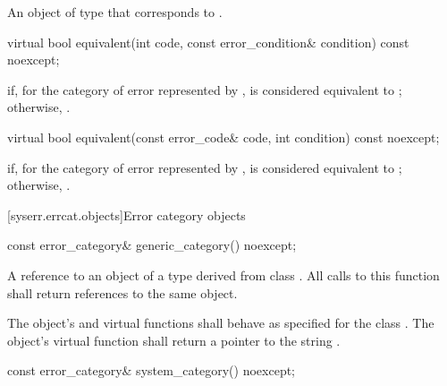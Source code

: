 \begin{itemdescr}
\pnum
\returns An object of type  that corresponds to .
\end{itemdescr}

%
\begin{itemdecl}
virtual bool equivalent(int code, const error_condition& condition) const noexcept;
\end{itemdecl}

\begin{itemdescr}
\pnum
\returns {} if, for the category of error represented by ,  is considered equivalent to ; otherwise, .
\end{itemdescr}

%
\begin{itemdecl}
virtual bool equivalent(const error_code& code, int condition) const noexcept;
\end{itemdecl}

\begin{itemdescr}
\pnum
\returns {} if, for the category of error represented by ,  is considered equivalent to ; otherwise, .
\end{itemdescr}

[syserr.errcat.objects]{Error category objects}

%
\begin{itemdecl}
const error_category& generic_category() noexcept;
\end{itemdecl}

\begin{itemdescr}
\pnum
\returns A reference to an object of a type derived from class .
All calls to this function shall return references to the same object.

\pnum
\remarks The object's  and  virtual functions shall behave as specified for the class . The object's  virtual function shall return a pointer to the string .
\end{itemdescr}

%
\begin{itemdecl}
const error_category& system_category() noexcept;
\end{itemdecl}

